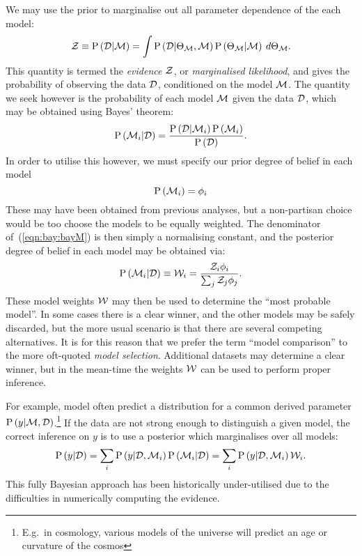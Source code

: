 We may use the prior to marginalise out all parameter dependence of the each model:
\begin{equation}
  \mathcal{Z}\equiv\mathrm{P}\left(\mathcal{D}\middle|\mathcal{M}\right) 
  =
  \int  \mathrm{P}\left(\mathcal{D}\middle|\Theta_{\mathcal{M}},\mathcal{M}\right)\mathrm{P}\left(\Theta_{\mathcal{M}}\middle|\mathcal{M}\right)\:d\Theta_{\mathcal{M}}.
  \label{eqn:bay:ev_def}
\end{equation}
This quantity is termed the {\em evidence\/} $\mathcal{Z}$, or {\em marginalised likelihood}, and gives the probability of observing the data $\mathcal{D}$, conditioned on the model $\mathcal{M}$. The quantity we seek however is the probability of each model $\mathcal{M}$ given the data $\mathcal{D}$, which may be obtained using Bayes' theorem:
\begin{equation}
  \mathrm{P}\left(\mathcal{M}_i\middle|\mathcal{D}\right) = \frac{\mathrm{P}\left(\mathcal{D}\middle|\mathcal{M}_i\right)\mathrm{P}\left(\mathcal{M}_i\right)}{\mathrm{P}\left(\mathcal{D}\right)}.
  \label{eqn:bay:bayM}
\end{equation}
In order to utilise this however, we must specify our prior degree of belief in each model
\begin{equation}
  \mathrm{P}\left(\mathcal{M}_i\right) = \phi_i
\end{equation}
These may have been obtained from previous analyses, but a non-partisan choice would be too choose the models to be equally weighted. The denominator of~(\ref{eqn:bay:bayM}) is then simply a normalising constant, and the posterior degree of belief in each model may be obtained via:
\begin{equation}
  \mathrm{P}\left(\mathcal{M}_i\middle|\mathcal{D}\right) 
  \equiv
  \mathcal{W}_i
  =
  \frac{\mathcal{Z}_i\phi_i}{\sum_j \mathcal{Z}_j\phi_j}.
\end{equation}
These model weights $\mathcal{W}$ may then be used to determine the ``most probable model''. In some cases there is a clear winner, and the other models may be safely discarded, but the more usual scenario is that there are several competing alternatives. It is for this reason that we prefer the term ``model comparison'' to the more oft-quoted {\em model selection}. Additional datasets may determine a clear winner, but in the mean-time the weights $\mathcal{W}$ can be used to perform proper inference. 

For example, model often predict a distribution for a common derived parameter $\mathrm{P}\left(y\middle|\mathcal{M},\mathcal{D}\right)$.\footnote{E.g.\ in cosmology, various models of the universe will predict an age or curvature of the cosmos} If the data are not strong enough to distinguish a given model, the correct inference on $y$ is to use a posterior which marginalises over all models:
\begin{equation}
  \mathrm{P}\left(y\middle|\mathcal{D}\right) 
  = \sum_i\mathrm{P}\left(y\middle|\mathcal{D},\mathcal{M}_i\right)\mathrm{P}\left(\mathcal{M}_i\middle|\mathcal{D}\right)
  = \sum_i\mathrm{P}\left(y\middle|\mathcal{D},\mathcal{M}_i\right)\mathcal{W}_i.
\end{equation}
This fully Bayesian approach has been historically under-utilised due to the difficulties in numerically computing the evidence.



